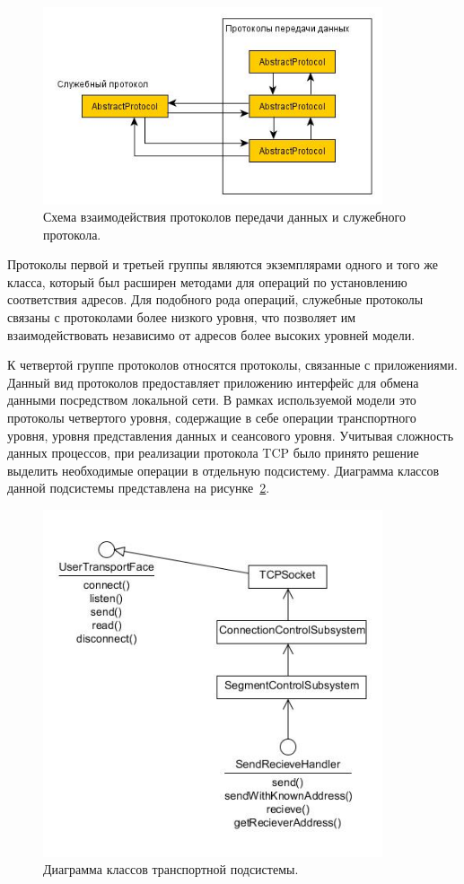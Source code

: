 \documentclass[12pt]{report}
\begin{document}
    \begin{figure}[h!]\center
        \includegraphics[width = 100mm]{Ch3Pic5}
        \caption{Схема взаимодействия протоколов передачи данных и служебного протокола. } \label{Pic5}
    \end{figure}
    
    Протоколы первой и третьей группы являются экземплярами одного и того же класса, который был расширен методами для операций по установлению соответствия адресов. Для подобного рода операций, служебные протоколы связаны с протоколами более низкого уровня, что позволяет им взаимодействовать независимо от адресов более высоких уровней модели. 
    
    К четвертой группе протоколов относятся протоколы, связанные с приложениями. Данный вид протоколов предоставляет приложению интерфейс для обмена данными посредством локальной сети. В рамках используемой модели это протоколы четвертого уровня, содержащие в себе операции транспортного уровня, уровня представления данных и сеансового уровня. Учитывая сложность данных процессов, при реализации протокола TCP было принято решение выделить необходимые операции в отдельную подсистему. Диаграмма классов данной подсистемы представлена на рисунке~\ref{Pic6}.
    
    \begin{figure}[h!]\center
        \includegraphics[width = 100mm]{Ch3Pic6}
        \caption{Диаграмма классов транспортной подсистемы. } \label{Pic6}
    \end{figure}
    
\end{document}
